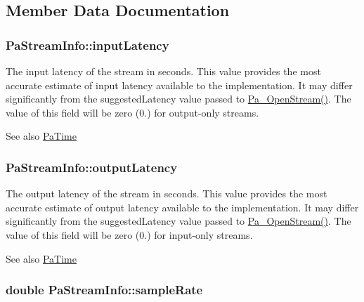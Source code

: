 \subsection{Member Data Documentation}
\hypertarget{struct_pa_stream_info_a1f5339e0fef75cea66d9153235698399}{
\subsubsection[{input\+Latency}]{ Pa\+Stream\+Info\+::input\+Latency}}\label{struct_pa_stream_info_a1f5339e0fef75cea66d9153235698399}
The input latency of the stream in seconds. This value provides the most accurate estimate of input latency available to the implementation. It may differ significantly from the suggested\+Latency value passed to \hyperlink{portaudio_8h_a443ad16338191af364e3be988014cbbe}{Pa\+\_\+\+Open\+Stream()}. The value of this field will be zero (0.) for output-\/only streams. \begin{DoxySeeAlso}{See also}
\hyperlink{portaudio_8h_af17a7e6d0471a23071acf8dbd7bbe4bd}{Pa\+Time} 
\end{DoxySeeAlso}
\hypertarget{struct_pa_stream_info_a372a81f39d90a85ae62225e9f57a7840}{
\subsubsection[{output\+Latency}]{ Pa\+Stream\+Info\+::output\+Latency}}\label{struct_pa_stream_info_a372a81f39d90a85ae62225e9f57a7840}
The output latency of the stream in seconds. This value provides the most accurate estimate of output latency available to the implementation. It may differ significantly from the suggested\+Latency value passed to \hyperlink{portaudio_8h_a443ad16338191af364e3be988014cbbe}{Pa\+\_\+\+Open\+Stream()}. The value of this field will be zero (0.) for input-\/only streams. \begin{DoxySeeAlso}{See also}
\hyperlink{portaudio_8h_af17a7e6d0471a23071acf8dbd7bbe4bd}{Pa\+Time} 
\end{DoxySeeAlso}
\hypertarget{struct_pa_stream_info_a9200fdee790d9155bc35d03be51ee2dd}{
\subsubsection[{sample\+Rate}]{\setlength{\rightskip}{0pt plus 5cm}double Pa\+Stream\+Info\+::sample\+Rate}}\label{struct_pa_stream_info_a9200fdee790d9155bc35d03be51ee2dd}
